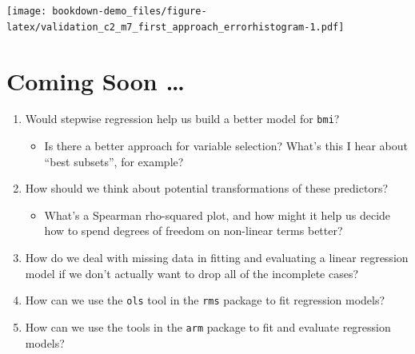 \documentclass[]{book}
\newenvironment{Shaded}{\begin{snugshade}}{\end{snugshade}}
\newcommand{\KeywordTok}[1]{\textcolor[rgb]{0.13,0.29,0.53}{\textbf{#1}}}
\newcommand{\DataTypeTok}[1]{\textcolor[rgb]{0.13,0.29,0.53}{#1}}
\newcommand{\DecValTok}[1]{\textcolor[rgb]{0.00,0.00,0.81}{#1}}
\newcommand{\StringTok}[1]{\textcolor[rgb]{0.31,0.60,0.02}{#1}}
\newcommand{\OperatorTok}[1]{\textcolor[rgb]{0.81,0.36,0.00}{\textbf{#1}}}
\newcommand{\NormalTok}[1]{#1}
\providecommand{\tightlist}{%
  \setlength{\itemsep}{0pt}\setlength{\parskip}{0pt}}
\theoremstyle{definition}
\theoremstyle{definition}
\theoremstyle{definition}
\theoremstyle{remark}
\begin{document}
\begin{Shaded}
\end{Shaded}

\texttt{[image: bookdown-demo\_files/figure-latex/validation\_c2\_m7\_first\_approach\_errorhistogram-1.pdf]}

\section{Coming Soon \ldots{}}\label{coming-soon}

\begin{enumerate}
\def\labelenumi{\arabic{enumi}.}
\tightlist
\item
  Would stepwise regression help us build a better model for
  \texttt{bmi}?

  \begin{itemize}
  \tightlist
  \item
    Is there a better approach for variable selection? What's this I
    hear about ``best subsets'', for example?
  \end{itemize}
\item
  How should we think about potential transformations of these
  predictors?

  \begin{itemize}
  \tightlist
  \item
    What's a Spearman rho-squared plot, and how might it help us decide
    how to spend degrees of freedom on non-linear terms better?
  \end{itemize}
\item
  How do we deal with missing data in fitting and evaluating a linear
  regression model if we don't actually want to drop all of the
  incomplete cases?
\item
  How can we use the \texttt{ols} tool in the \texttt{rms} package to
  fit regression models?
\item
  How can we use the tools in the \texttt{arm} package to fit and
  evaluate regression models?
\end{enumerate}
\end{document}
